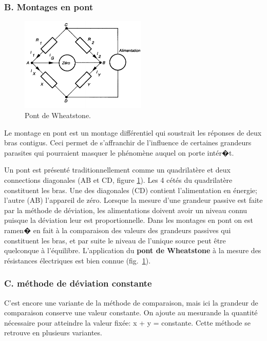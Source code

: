 \subsubsection{B. Montages en pont}

\begin{figure}
   \centering
   \includegraphics[width=6cm]{assets/figures/wheatstone.pdf}
   \caption{Pont de Wheatstone.}
   \label{fig:pont}
\end{figure}
Le montage en pont est un montage différentiel qui soustrait les réponses de deux bras contigus. Ceci permet de s'affranchir de l'influence de certaines grandeurs parasites qui pourraient masquer le phénomène auquel on porte intér�t.

Un pont est présenté traditionnellement comme un quadrilatère et deux connections diagonales (AB et CD, figure \ref{fig:pont}). Les 4 cétés du quadrilatère constituent les bras. Une des diagonales (CD) contient l'alimentation en énergie; l'autre (AB) l'appareil de zéro. Lorsque la mesure d'une grandeur passive est faite par la méthode de déviation, les alimentations doivent avoir un niveau connu puisque la déviation leur est proportionnelle. Dans les montages en pont on est ramen� en fait à la comparaison des valeurs des grandeurs passives qui constituent les bras, et par suite le niveau de l'unique source peut être quelconque à l'équilibre. L'application du \textbf{pont de Wheatstone} à la mesure des résistances électriques est bien connue (fig.~\ref{fig:pont}).

\subsubsection{C. méthode de déviation constante}

C'est encore une variante de la méthode de comparaison, mais ici la grandeur de comparaison conserve une valeur constante.  On ajoute au mesurande la quantité nécessaire pour atteindre la valeur fixée: x + y = constante. Cette méthode se retrouve en plusieurs variantes.

